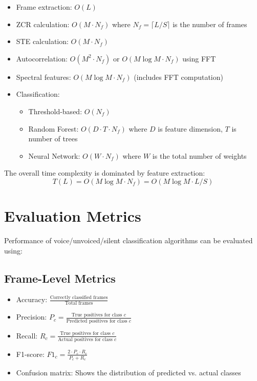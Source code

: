 \documentclass[10pt,journal,compsoc]{IEEEtran}
\begin{document}
\begin{itemize}
    \item Frame extraction: $O(L)$
    \item ZCR calculation: $O(M \cdot N_f)$ where $N_f = \lceil L/S \rceil$ is the number of frames
    \item STE calculation: $O(M \cdot N_f)$
    \item Autocorrelation: $O(M^2 \cdot N_f)$ or $O(M \log M \cdot N_f)$ using FFT
    \item Spectral features: $O(M \log M \cdot N_f)$ (includes FFT computation)
    \item Classification: 
        \begin{itemize}
            \item Threshold-based: $O(N_f)$
            \item Random Forest: $O(D \cdot T \cdot N_f)$ where $D$ is feature dimension, $T$ is number of trees
            \item Neural Network: $O(W \cdot N_f)$ where $W$ is the total number of weights
        \end{itemize}
\end{itemize}

The overall time complexity is dominated by feature extraction:
\begin{equation}
T(L) = O(M \log M \cdot N_f) = O(M \log M \cdot L/S)
\end{equation}

\section{Evaluation Metrics}
Performance of voice/unvoiced/silent classification algorithms can be evaluated using:

\subsection{Frame-Level Metrics}
\begin{itemize}
    \item Accuracy: $\frac{\text{Correctly classified frames}}{\text{Total frames}}$
    \item Precision: $P_c = \frac{\text{True positives for class $c$}}{\text{Predicted positives for class $c$}}$
    \item Recall: $R_c = \frac{\text{True positives for class $c$}}{\text{Actual positives for class $c$}}$
    \item F1-score: $F1_c = \frac{2 \cdot P_c \cdot R_c}{P_c + R_c}$
    \item Confusion matrix: Shows the distribution of predicted vs. actual classes
\end{itemize}
\end{document}
